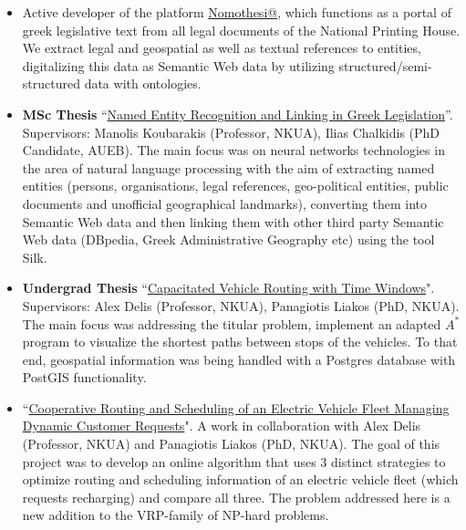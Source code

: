 \documentclass[a4paper,oneside,11pt]{article}
\begin{document}
\begin{itemize}

\item Active developer of the platform \href{http://legislation.di.uoa.gr/}{Nomothesi@}, which functions as a portal of greek legislative text from all legal documents of the National Printing House. We extract legal and geospatial as well as textual references to entities, digitalizing this data as Semantic Web data by utilizing structured/semi-structured data with ontologies.

\item \begin{sloppypar}
\textbf{MSc Thesis} ``\href{https://pergamos.lib.uoa.gr/uoa/dl/frontend/en/browse/2766525}{Named Entity Recognition and Linking in Greek Legislation}''. Supervisors: Manolis Koubarakis (Professor, NKUA), Ilias Chalkidis (PhD Candidate, AUEB).
The main focus was on neural networks technologies in the area of natural language processing with the aim of extracting named entities (persons, organisations, legal references, geo-political entities, public documents and unofficial geographical landmarks), 
converting them into Semantic Web data and then linking them with other third party Semantic Web data (DBpedia, Greek Administrative Geography etc) using the tool Silk.

\end{sloppypar}

\item \begin{sloppypar}
\textbf{Undergrad Thesis} ``\href{http://efessos.lib.uoa.gr/applications/disserts.nsf/0f1ab5fee83fbb88c225770c0042ce4f/8da6d56136caaacec2257ea6004c9349?OpenDocument}{Capacitated Vehicle Routing with Time Windows}". Supervisors: Alex Delis (Professor, NKUA), Panagiotis Liakos (PhD, NKUA). 
The main focus was addressing the titular problem, implement an adapted $A^{*}$ program to visualize the shortest paths between stops of the vehicles. To that end, geospatial information was being handled with a Postgres database with PostGIS functionality.

\end{sloppypar}

\item \begin{sloppypar}
``\href{https://bitbucket.org/Metimdjai/vrppd/src/master/}{Cooperative Routing and Scheduling of an Electric Vehicle Fleet Managing Dynamic Customer Requests}". A work in collaboration with Alex Delis (Professor, NKUA) and Panagiotis Liakos (PhD, NKUA). 
The goal of this project was to develop an online algorithm that uses 3 distinct strategies to optimize routing and scheduling information of an electric vehicle fleet (which requests recharging) and compare all three. The problem addressed here is a new addition to the VRP-family of NP-hard problems.


\end{sloppypar}
\end{itemize}
\end{document}
